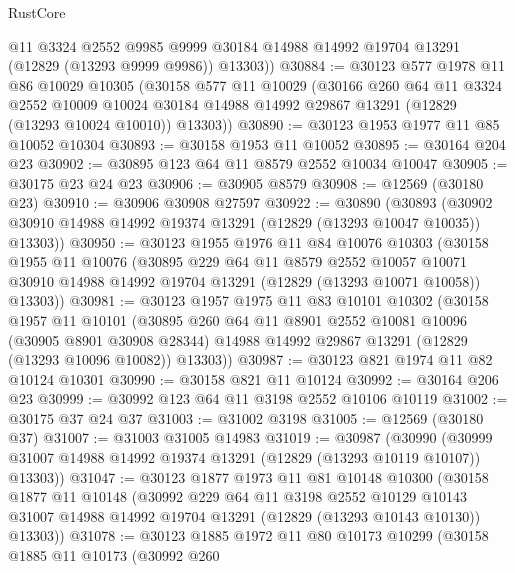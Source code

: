 \begin{lexlean}{RustCore}
\begin{coremodule}
        @11
        @3324
        @2552
        @9985
        @9999
        @30184
        @14988
        @14992
        @19704
        @13291
        (@12829 (@13293 @9999 @9986))
        @13303))
@30884 := @30123
    @577
    @1978
    @11
    @86
    @10029
    @10305
    (@30158
      @577
      @11
      @10029
      (@30166
        @260
        @64
        @11
        @3324
        @2552
        @10009
        @10024
        @30184
        @14988
        @14992
        @29867
        @13291
        (@12829 (@13293 @10024 @10010))
        @13303))
@30890 := @30123 @1953 @1977 @11 @85 @10052 @10304
@30893 := @30158 @1953 @11 @10052
@30895 := @30164 @204 @23
@30902 := @30895 @123 @64 @11 @8579 @2552 @10034 @10047
@30905 := @30175 @23 @24 @23
@30906 := @30905 @8579
@30908 := @12569 (@30180 @23)
@30910 := @30906 @30908 @27597
@30922 := @30890
    (@30893 (@30902 @30910 @14988 @14992 @19374 @13291 (@12829 (@13293 @10047 @10035)) @13303))
@30950 := @30123
    @1955
    @1976
    @11
    @84
    @10076
    @10303
    (@30158
      @1955
      @11
      @10076
      (@30895
        @229
        @64
        @11
        @8579
        @2552
        @10057
        @10071
        @30910
        @14988
        @14992
        @19704
        @13291
        (@12829 (@13293 @10071 @10058))
        @13303))
@30981 := @30123
    @1957
    @1975
    @11
    @83
    @10101
    @10302
    (@30158
      @1957
      @11
      @10101
      (@30895
        @260
        @64
        @11
        @8901
        @2552
        @10081
        @10096
        (@30905 @8901 @30908 @28344)
        @14988
        @14992
        @29867
        @13291
        (@12829 (@13293 @10096 @10082))
        @13303))
@30987 := @30123 @821 @1974 @11 @82 @10124 @10301
@30990 := @30158 @821 @11 @10124
@30992 := @30164 @206 @23
@30999 := @30992 @123 @64 @11 @3198 @2552 @10106 @10119
@31002 := @30175 @37 @24 @37
@31003 := @31002 @3198
@31005 := @12569 (@30180 @37)
@31007 := @31003 @31005 @14983
@31019 := @30987
    (@30990 (@30999 @31007 @14988 @14992 @19374 @13291 (@12829 (@13293 @10119 @10107)) @13303))
@31047 := @30123
    @1877
    @1973
    @11
    @81
    @10148
    @10300
    (@30158
      @1877
      @11
      @10148
      (@30992
        @229
        @64
        @11
        @3198
        @2552
        @10129
        @10143
        @31007
        @14988
        @14992
        @19704
        @13291
        (@12829 (@13293 @10143 @10130))
        @13303))
@31078 := @30123
    @1885
    @1972
    @11
    @80
    @10173
    @10299
    (@30158
      @1885
      @11
      @10173
      (@30992
        @260

\end{coremodule}
\end{lexlean}
